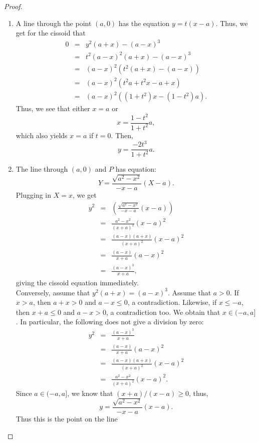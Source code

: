 \begin{proof}
\begin{enumerate}
    \item A line through the point $(a,0)$ has the equation $y = t(x-a)$. Thus, we get for the cissoid that
    \begin{eqnarray*}
        0
        & = & y^2 (a+x) - (a-x)^3\\
        & = & t^2 (a-x)^2 (a+x) - (a-x)^3\\
        & = & (a-x)^2 ( t^2 (a+x) - (a-x))\\
        & = & (a-x)^2 ( t^2 a + t^2 x - a + x)\\
        & = & (a-x)^2 ( (1+t^2)x - (1 - t^2)a).
    \end{eqnarray*}
    Thus, we see that either $x=a$ or
    $$x = \frac{1-t^2}{1+t^2}a,$$
    which also yields $x=a$ if $t=0$. Then,
    $$y = \frac{-2t^3}{1+t^2}a.$$
    \item The line through $(a,0)$ and $P$ has equation:
    $$Y = \frac{\sqrt{a^2 - x^2}}{-x-a}(X-a).$$
    Plugging in $X = x$, we get
    \begin{eqnarray*}
        y^2
        & = & \left(\frac{\sqrt{a^2 - x^2}}{-x-a}(x-a)\right)\\
        & = & \frac{a^2 - x^2}{(x+a)^2}(x-a)^2\\
        & = & \frac{(a-x)(a+x)}{(x+a)^2}(x-a)^2\\
        & = & \frac{(a-x)}{x+a}(a-x)^2\\
        & = & \frac{(a-x)^3}{x+a},
    \end{eqnarray*}
    giving the cissoid equation immediately.\\
    Conversely, assume that $y^2 (a+x) = (a-x)^3$. Assume that $a>0$. If $x>a$, then $a+x>0$ and $a-x\leq 0$, a contradiction. Likewise, if $x\leq -a$, then $x+a\leq 0$ and $a-x>0$, a contradiction too. We obtain that $x\in (-a,a]$. In particular, the following does not give a division by zero:
    \begin{eqnarray*}
        y^2
        & = & \frac{(a-x)^3}{x+a}\\
        & = & \frac{(a-x)}{x+a}(a-x)^2\\
        & = & \frac{(a-x)(a+x)}{(x+a)^2}(x-a)^2\\
        & = & \frac{a^2 - x^2}{(x+a)^2}(x-a)^2.    
    \end{eqnarray*}
    Since $a\in (-a,a]$, we know that $(x+a)/(x-a)\geq 0$, thus,
    $$y = \frac{\sqrt{a^2 - x^2}}{-x-a}(x-a).$$
    Thus this is the point on the line

\end{enumerate}
\end{proof}
